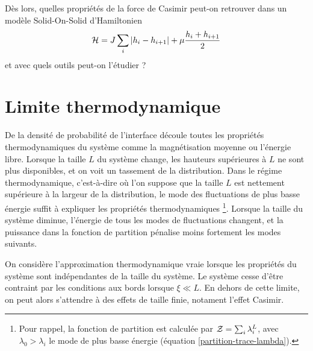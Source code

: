 Dès lors, quelles propriétés de la force de Casimir peut-on retrouver dans un modèle Solid-On-Solid d'Hamiltonien
\begin{align}
    \mathcal{H} = J \sum_i |h_i-h_{i+1}| + \mu \frac{h_i+h_{i+1}}{2}
\end{align}
et avec quels outils peut-on l'étudier ?

\section{Limite thermodynamique}

De la densité de probabilité de l'interface découle toutes les propriétés thermodynamiques du système comme la magnétisation moyenne ou l'énergie libre. Lorsque la taille $L$ du système change, les hauteurs supérieures à $L$ ne sont plus disponibles, et on voit un tassement de la distribution. Dans le régime thermodynamique, c'est-à-dire où l'on suppose que la taille $L$ est nettement supérieure à la largeur de la distribution, le mode des fluctuations de plus basse énergie suffit à expliquer les propriétés thermodynamiques \footnote{Pour rappel, la fonction de partition est calculée par $\mathcal{Z} = \sum_i \lambda_i^L$, avec $\lambda_0 \greater \lambda_i$ le mode de plus basse énergie (équation \ref{partition-trace-lambda}).}. Lorsque la taille du système diminue, l'énergie de tous les modes de fluctuations changent, et la puissance dans la fonction de partition pénalise moins fortement les modes suivants. 

On considère l'approximation thermodynamique vraie lorsque les propriétés du système sont indépendantes de la taille du système. Le système cesse d'être contraint par les conditions aux bords lorsque $\xi \ll L$. En dehors de cette limite, on peut alors s'attendre à des effets de taille finie, notament l'effet Casimir.

